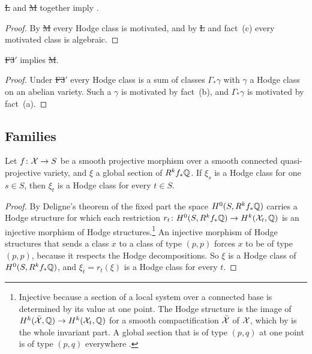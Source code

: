 \begin{proposition}\label{prop:LM}
\st{L} and \st{M} together imply \HC.
\end{proposition}

\begin{proof}
By \st{M} every Hodge class is motivated, and by \st{L} and fact~(c) every
motivated class is algebraic.
\end{proof}

\begin{proposition}\label{prop:f3m}
\st{F3$'$} implies \st{M}.
\end{proposition}

\begin{proof}
Under \st{F3$'$} every Hodge class is a sum of classes $\Gamma_{*}\gamma$ with
$\gamma$ a Hodge class on an abelian variety. Such a $\gamma$ is motivated by
fact~(b), and $\Gamma_{*}\gamma$ is motivated by fact~(a).
\end{proof}

\subsection{Families}

\begin{lemma}\label{lem:fixed}
Let $f\colon\mathcal{X}\to S$ be a smooth projective morphism over a smooth connected
quasi-projective variety, and $\xi$ a global section of $R^{k}f_{*}\mathbb{Q}$. If
$\xi_{s}$ is a Hodge class for one $s\in S$, then $\xi_{t}$ is a Hodge class
for every $t\in S$.
\end{lemma}

\begin{proof}
By Deligne's theorem of the fixed part \cite[Corollaire~4.1.2]{Del71} the
space $H^{0}(S,R^{k}f_{*}\mathbb{Q})$ carries a Hodge structure for which each
restriction $r_{t}\colon H^{0}(S,R^{k}f_{*}\mathbb{Q})\to H^{k}(\mathcal{X}_{t},\mathbb{Q})$ is an
injective morphism of Hodge structures.\footnote{Injective because a section
of a local system over a connected base is determined by its value at one
point. The Hodge structure is the image of $H^{k}(\bar{\mathcal{X}},\mathbb{Q})\to
H^{k}(\mathcal{X}_{t},\mathbb{Q})$ for a smooth compactification $\bar{\mathcal{X}}$ of $\mathcal{X}$, which
by \cite[4.1.1]{Del71} is the whole invariant part. A global section that is
of type $(p,q)$ at one point is of type $(p,q)$ everywhere
\cite[4.1.3.1]{Del71}.} An injective morphism
of Hodge structures that sends a class $x$ to a class of type $(p,p)$
forces $x$ to be of type $(p,p)$, because it respects the Hodge
decompositions. So $\xi$ is a Hodge class of $H^{0}(S,R^{k}f_{*}\mathbb{Q})$, and
$\xi_{t}=r_{t}(\xi)$ is a Hodge class for every $t$.
\end{proof}

